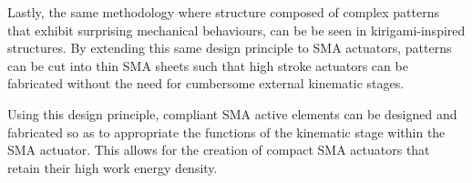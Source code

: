 Lastly, the same methodology where structure composed of complex patterns that exhibit surprising mechanical behaviours, can be be seen in kirigami-inspired structures. By extending this same design principle to SMA actuators, patterns can be cut into thin SMA sheets such that high stroke actuators can be fabricated without the need for cumbersome external kinematic stages.

Using this design principle, compliant SMA active elements can be designed and fabricated so as to appropriate the functions of the kinematic stage within the SMA actuator. This allows for the creation of compact SMA actuators that retain their high work energy density.
